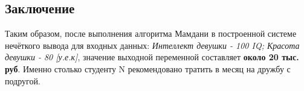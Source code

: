 \documentclass[12pt, a4paper]{article}
\begin{document}
\subsection{Заключение}
Таким образом, после выполнения алгоритма Мамдани в построенной системе нечёткого вывода для входных данных: \textit{Интеллект девушки - 100 IQ; Красота девушки - 80 [у.е.к]}, значение выходной переменной составляет \textbf{около 20 тыс. руб}. Именно столько студенту N рекомендовано тратить в месяц на дружбу с подругой.
\end{document}
